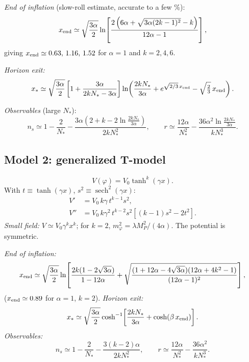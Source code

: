 \documentclass[11pt,a4paper]{article}
\DeclareMathOperator{\sech}{sech}
\newcommand{\MP}{M_P}
\newcommand{\aatt}{\alpha}
\begin{document}
\emph{End of inflation} (slow-roll estimate, accurate to a few \%):
\begin{equation}
x_{\rm end}\simeq\sqrt{\frac{3\aatt}{2}}\ln\!\left[\frac{2\left(6\aatt+\sqrt{3\aatt(2k-1)^2}-k\right)}{12\aatt-1}\right],
\label{eq:xendE}
\end{equation}
giving $x_{\rm end}\simeq 0.63,\,1.16,\,1.52$ for $\aatt=1$ and $k=2,4,6$.

\emph{Horizon exit:}
\begin{equation}
x_*\simeq\sqrt{\frac{3\aatt}{2}}\left[1+\frac{3\aatt}{2kN_*-3\aatt}\right]
\ln\!\left(\frac{2kN_*}{3\aatt}+e^{\sqrt{2/3}\,x_{\rm end}}-\sqrt{\tfrac23}\,x_{\rm end}\right).
\end{equation}

\emph{Observables} (large $N_*$):
\begin{equation}
n_s\simeq 1-\frac{2}{N_*}-\frac{3\aatt\left(2+k-2\ln\frac{2kN_*}{3\aatt}\right)}{2kN_*^2},\qquad
r\simeq\frac{12\aatt}{N_*^2}-\frac{36\aatt^2\ln\frac{2kN_*}{3\aatt}}{kN_*^3}.
\end{equation}

\subsection{Model 2: generalized T-model}
\label{sec:T}
\begin{equation}
V(\varphi) = V_0\tanh^{k}\!\left(\gamma x\right).
\label{eq:VT}
\end{equation}
With $t\equiv\tanh(\gamma x)$, $s^2\equiv\sech^2(\gamma x)$:
\begin{align}
V' &= V_0\,k\gamma\,t^{k-1}s^2, \\
V'' &= V_0\,k\gamma^2\,t^{k-2}s^2\left[(k-1)s^2-2t^2\right].
\end{align}
\emph{Small field:} $V\simeq V_0\gamma^k x^k$; for $k=2$, $m_\varphi^2 = \lambda\MP^2/(4\aatt)$. The potential is symmetric.

\emph{End of inflation:}
\begin{equation}
x_{\rm end}\simeq\sqrt{\frac{3\aatt}{2}}\ln\!\left[\frac{2k(1-2\sqrt{3\aatt})}{1-12\aatt}
+\sqrt{\frac{(1+12\aatt-4\sqrt{3\aatt})(12\aatt+4k^2-1)}{(12\aatt-1)^2}}\right],
\end{equation}
($x_{\rm end}\simeq 0.89$ for $\aatt=1$, $k=2$). \emph{Horizon exit:}
\begin{equation}
x_*\simeq\sqrt{\frac{3\aatt}{2}}\cosh^{-1}\!\left[\frac{2kN_*}{3\aatt}+\cosh\!\left(\beta\,x_{\rm end}\right)\right].
\end{equation}
\emph{Observables:}
\begin{equation}
n_s\simeq 1-\frac{2}{N_*}-\frac{3(k-2)\aatt}{2kN_*^2},\qquad
r\simeq\frac{12\aatt}{N_*^2}-\frac{36\aatt^2}{kN_*^3}.
\end{equation}
\end{document}
